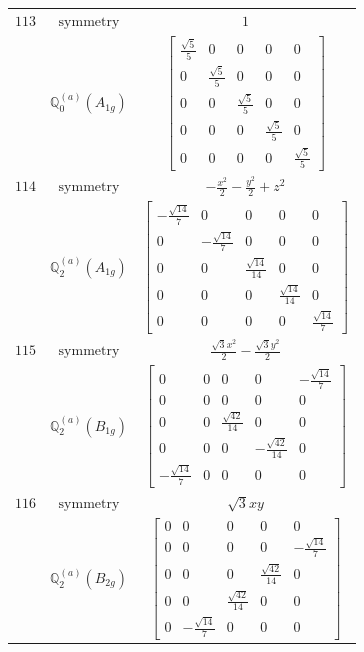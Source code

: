 \documentclass[fleqn,8pt,landscape]{jsarticle}
\begin{document}
\begin{longtable}{ccc}
$ 113 $ & $ \text{symmetry} $ & $ 1 $ \\
$  $ & $ \mathbb{Q}_{0}^{(a)}(A_{1g}) $ & $ \begin{bmatrix} \frac{\sqrt{5}}{5} & 0 & 0 & 0 & 0 \\ 0 & \frac{\sqrt{5}}{5} & 0 & 0 & 0 \\ 0 & 0 & \frac{\sqrt{5}}{5} & 0 & 0 \\ 0 & 0 & 0 & \frac{\sqrt{5}}{5} & 0 \\ 0 & 0 & 0 & 0 & \frac{\sqrt{5}}{5} \end{bmatrix} $ \\ \hline
$ 114 $ & $ \text{symmetry} $ & $ - \frac{x^{2}}{2} - \frac{y^{2}}{2} + z^{2} $ \\
$  $ & $ \mathbb{Q}_{2}^{(a)}(A_{1g}) $ & $ \begin{bmatrix} - \frac{\sqrt{14}}{7} & 0 & 0 & 0 & 0 \\ 0 & - \frac{\sqrt{14}}{7} & 0 & 0 & 0 \\ 0 & 0 & \frac{\sqrt{14}}{14} & 0 & 0 \\ 0 & 0 & 0 & \frac{\sqrt{14}}{14} & 0 \\ 0 & 0 & 0 & 0 & \frac{\sqrt{14}}{7} \end{bmatrix} $ \\ \hline
$ 115 $ & $ \text{symmetry} $ & $ \frac{\sqrt{3} x^{2}}{2} - \frac{\sqrt{3} y^{2}}{2} $ \\
$  $ & $ \mathbb{Q}_{2}^{(a)}(B_{1g}) $ & $ \begin{bmatrix} 0 & 0 & 0 & 0 & - \frac{\sqrt{14}}{7} \\ 0 & 0 & 0 & 0 & 0 \\ 0 & 0 & \frac{\sqrt{42}}{14} & 0 & 0 \\ 0 & 0 & 0 & - \frac{\sqrt{42}}{14} & 0 \\ - \frac{\sqrt{14}}{7} & 0 & 0 & 0 & 0 \end{bmatrix} $ \\ \hline
$ 116 $ & $ \text{symmetry} $ & $ \sqrt{3} x y $ \\
$  $ & $ \mathbb{Q}_{2}^{(a)}(B_{2g}) $ & $ \begin{bmatrix} 0 & 0 & 0 & 0 & 0 \\ 0 & 0 & 0 & 0 & - \frac{\sqrt{14}}{7} \\ 0 & 0 & 0 & \frac{\sqrt{42}}{14} & 0 \\ 0 & 0 & \frac{\sqrt{42}}{14} & 0 & 0 \\ 0 & - \frac{\sqrt{14}}{7} & 0 & 0 & 0 \end{bmatrix} $ \\ \hline

\end{longtable}
\end{document}
